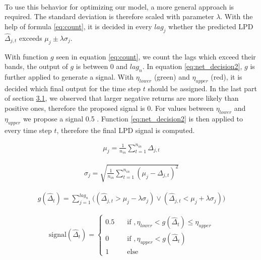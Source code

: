 \documentclass[
]{article}
\begin{document}
~

To use this behavior for optimizing our model, a more general approach
is required. The standard deviation is therefore scaled with parameter
\(\lambda\). With the help of formula \ref{eq:count}, it is decided in
every \(lag_{j}\) whether the predicted LPD \(\hat{\Delta}_{j,t}\)
exceeds \(\mu_{j} \pm \lambda \sigma_{j}\).

With function \(g\) seen in equation \ref{eq:count}, we count the lags
which exceed their bands, the output of \(g\) is between 0 and
\(lag_{n}\). In equation \ref{eq:net_decision2}, \(g\) is further
applied to generate a signal. With \(\eta_{lower}\) (green) and
\(\eta_{upper}\) (red), it is decided which final output for the time
step \(t\) should be assigned. In the last part of section
\protect\hyperlink{data_exploration}{3.1}, we observed that larger
negative returns are more likely than positive ones, therefore the
proposed signal is 0. For values between \(\eta_{lower}\) and
\(\eta_{upper}\) we propose a signal 0.5 . Function
\ref{eq:net_decision2} is then applied to every time step \(t\),
therefore the final LPD signal is computed.

\newpage

\begin{align} \label{eq:Ybar}
\mu_{j}=\frac{1}{n_{in}} \sum_{t=1}^{n_{in}}\Delta_{j,t}
\end{align}

\begin{align} \label{eq:sdY}
\sigma_{j}=\sqrt{  \frac{1}{n_{in}}  \sum_{t=1}^{n_{in}}(\mu_{j}-\Delta_{j,t})^{2} }
\end{align}

\begin{align} \label{eq:count}
g(\hat{\Delta}_{t})=\sum_{j=1}^{lag_{n}}\Big((\hat{\Delta}_{j,t}>\mu_{j} - \lambda \sigma_{j} )\vee( \hat{\Delta}_{j,t}<\mu_{j} + \lambda \sigma_{j})\Big)
\end{align}

\begin{equation}\label{eq:net_decision2}
\text{signal}(\hat{\Delta}_{t}) =
\begin{cases} 
  0.5    & \quad \text{if } ,  \eta_{lower} < g(\hat{\Delta}_{t}) \le \eta_{upper}    \\                                              
  0      & \quad \text{if } ,   \eta_{upper} < g(\hat{\Delta}_{t}) \\
  1      & \quad \text{else}
   \end{cases}
\end{equation}
\end{document}
